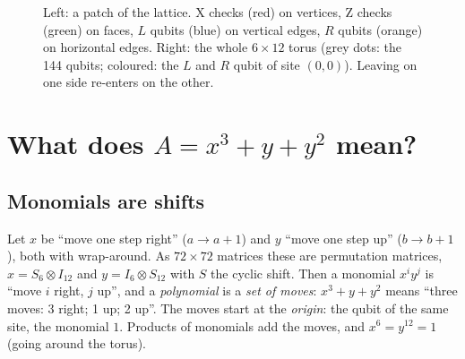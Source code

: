\documentclass[11pt]{article}
\newcommand{\LposT}[2]{({#1}, {#2})}
\newcommand{\RposT}[2]{({mod(#1+4,6)+0.5}, {mod(#2+1,12)+0.5})}
\newcommand{\torus}{%
  \foreach \xx in {0,...,5} \draw[lat] (\xx,-0.25) -- (\xx,11.75);
  \foreach \yy in {0,...,11} \draw[lat] (-0.25,\yy+0.5) -- (5.75,\yy+0.5);
  \foreach \a in {0,...,5}{\foreach \b in {0,...,11}{%
    \node[dot] at \LposT{\a}{\b} {}; \node[dot] at \RposT{\a}{\b} {};}}
  \draw[faint] (-0.25,-0.25) rectangle (5.75,11.75);}
\begin{document}
\begin{figure}[h]
\centering
{}
\hspace{1.2cm}
\caption{Left: a patch of the lattice. X checks (red) on vertices, Z checks (green) on faces,
$L$ qubits (blue) on vertical edges, $R$ qubits (orange) on horizontal edges. Right: the whole
$6\times 12$ torus (grey dots: the 144 qubits; coloured: the $L$ and $R$ qubit of site $(0,0)$).
Leaving on one side re-enters on the other.}
\label{fig:cell}
\end{figure}

\section{What does $A = x^3+y+y^2$ mean?}

\subsection{Monomials are shifts}
Let $x$ be ``move one step right'' ($a\to a+1$) and $y$ ``move one step up''
($b\to b+1$), both with wrap-around. As $72\times72$ matrices these are permutation
matrices, $x = S_6\otimes I_{12}$ and $y = I_6\otimes S_{12}$ with $S$ the cyclic shift.
Then a monomial $x^i y^j$ is ``move $i$ right, $j$ up'', and a \emph{polynomial} is a
\emph{set of moves}: $x^3 + y + y^2$ means ``three moves: 3 right; 1 up; 2 up''. The moves
start at the \emph{origin}: the qubit of the same site, the monomial $1$.
Products of monomials add the moves, and $x^6 = y^{12} = 1$ (going around the torus).
\end{document}
